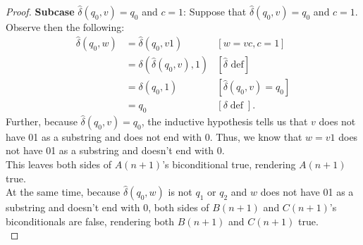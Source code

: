 \documentclass[10pt]{article}
\begin{document}
\begin{enumerate}[label={}]
\begin{proof}
              \textbf{Subcase }$\hat{\delta}\left(q_0, v\right)=q_0$ and $c=1$: Suppose that $\hat{\delta}\left(q_0, v\right)=q_0$ and $c=1$. Observe then the following:
              $$
                  \begin{aligned}
                      \hat{\delta}\left(q_0, w\right) & =\hat{\delta}\left(q_0, v 1\right)                     & {[w=v c, c=1] }                                     \\
                                                      & =\delta\left(\hat{\delta}\left(q_0, v\right), 1\right) & {[\hat{\delta} \text { def}] }                      \\
                                                      & =\delta\left(q_0, 1\right)                             & {\left[\hat{\delta}\left(q_0, v\right)=q_0\right] } \\
                                                      & =q_0                                                   & {[\delta \operatorname{def}] . }
                  \end{aligned}
              $$
              Further, because $\hat{\delta}\left(q_0, v\right)=q_0$, the inductive hypothesis tells us that $v$ does not have 01 as a substring and does not end with 0. Thus, we know that $w=v1$ does not have 01 as a substring and doesn't end with 0.\\
              This leaves both sides of $A(n+1)$'s biconditional true, rendering $A(n+1)$ true.\\
              At the same time, because $\hat{\delta}\left(q_0, w\right)$ is not $q_1$ or $q_2$ and $w$ does not have 01 as a substring and doesn't end with 0, both sides of $B(n+1)$ and $C(n+1)$'s biconditionals are false, rendering both $B(n+1)$ and $C(n+1)$ true.\\


\end{proof}
\end{enumerate}
\end{document}
